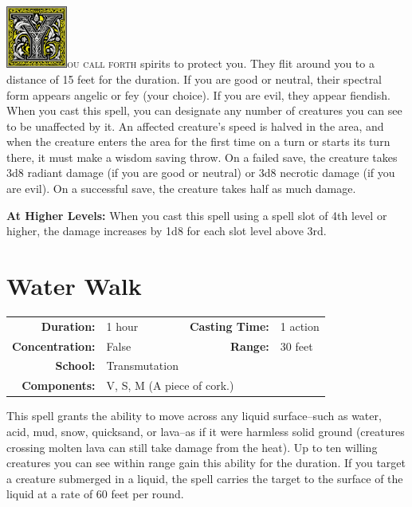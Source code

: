 \documentclass[12pt,showtrims]{memoir}
\begin{document}
\vspace{1\baselineskip}\noindent 
\lettrine[lines=4]{\includegraphics[height=58pt]{initials/Y.png}}{ou call forth} spirits to protect you. They flit around you to a distance of 15 feet for the duration. If you are good or neutral, their spectral form appears angelic or fey (your choice). If you are evil, they appear fiendish. When you cast this spell, you can designate any number of creatures you can see to be unaffected by it. An affected creature's speed is halved in the area, and when the creature enters the area for the first time on a turn or starts its turn there, it must make a wisdom saving throw. On a failed save, the creature takes 3d8 radiant damage (if you are good or neutral) or 3d8 necrotic damage (if you are evil). On a successful save, the creature takes half as much damage.

\vspace{8pt} \noindent\textbf{At Higher Levels:} When you cast this spell using a spell slot of 4th level or higher, the damage increases by 1d8 for each slot level above 3rd.
\newpage
\section*{Water Walk}

{
\small\centering\vspace{-6pt}
\begin{tabular}{rlrl}
\toprule

\textbf{Duration:} & 1 hour &
\textbf{Casting Time:} & 1 action \\
\textbf{Concentration:} & False &
\textbf{Range:} & 30 feet \\
\textbf{School:} & Transmutation \\
\textbf{Components:} & \multicolumn{3}{p{0.7\textwidth}}{V, S, M (A piece of cork.)}\\

\bottomrule
\end{tabular}
}

\vspace{1\baselineskip}\noindent This spell grants the ability to move across any liquid surface--such as water, acid, mud, snow, quicksand, or lava--as if it were harmless solid ground (creatures crossing molten lava can still take damage from the heat). Up to ten willing creatures you can see within range gain this ability for the duration. If you target a creature submerged in a liquid, the spell carries the target to the surface of the liquid at a rate of 60 feet per round.
\end{document}
